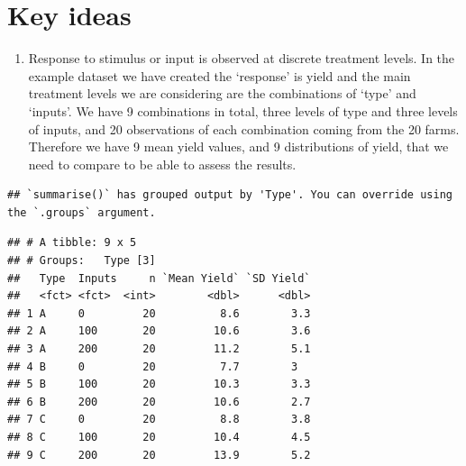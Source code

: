 \documentclass[
]{book}
\newenvironment{Shaded}{\begin{snugshade}}{\end{snugshade}}
\newcommand{\DataTypeTok}[1]{\textcolor[rgb]{0.13,0.29,0.53}{#1}}
\newcommand{\DecValTok}[1]{\textcolor[rgb]{0.00,0.00,0.81}{#1}}
\newcommand{\FloatTok}[1]{\textcolor[rgb]{0.00,0.00,0.81}{#1}}
\newcommand{\KeywordTok}[1]{\textcolor[rgb]{0.13,0.29,0.53}{\textbf{#1}}}
\newcommand{\NormalTok}[1]{#1}
\newcommand{\OperatorTok}[1]{\textcolor[rgb]{0.81,0.36,0.00}{\textbf{#1}}}
\newcommand{\StringTok}[1]{\textcolor[rgb]{0.31,0.60,0.02}{#1}}
\providecommand{\tightlist}{%
  \setlength{\itemsep}{0pt}\setlength{\parskip}{0pt}}
\begin{document}
\begin{Shaded}
\end{Shaded}

\hypertarget{key-ideas}{%
\section{Key ideas}\label{key-ideas}}

\begin{enumerate}
\def\labelenumi{\arabic{enumi}.}
\tightlist
\item
  Response to stimulus or input is observed at discrete treatment levels. In the example dataset we have created the `response' is yield and the main treatment levels we are considering are the combinations of `type' and `inputs'. We have 9 combinations in total, three levels of type and three levels of inputs, and 20 observations of each combination coming from the 20 farms. Therefore we have 9 mean yield values, and 9 distributions of yield, that we need to compare to be able to assess the results.
\end{enumerate}

\begin{Shaded}
\end{Shaded}

\begin{verbatim}
## `summarise()` has grouped output by 'Type'. You can override using the `.groups` argument.
\end{verbatim}

\begin{verbatim}
## # A tibble: 9 x 5
## # Groups:   Type [3]
##   Type  Inputs     n `Mean Yield` `SD Yield`
##   <fct> <fct>  <int>        <dbl>      <dbl>
## 1 A     0         20          8.6        3.3
## 2 A     100       20         10.6        3.6
## 3 A     200       20         11.2        5.1
## 4 B     0         20          7.7        3  
## 5 B     100       20         10.3        3.3
## 6 B     200       20         10.6        2.7
## 7 C     0         20          8.8        3.8
## 8 C     100       20         10.4        4.5
## 9 C     200       20         13.9        5.2
\end{verbatim}
\end{document}

